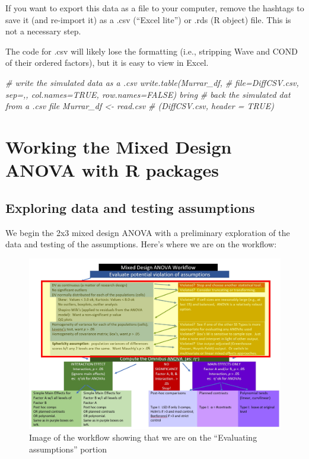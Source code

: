 \documentclass[
  11pt,
]{book}
\newenvironment{Shaded}{\begin{snugshade}}{\end{snugshade}}
\newcommand{\CommentTok}[1]{\textcolor[rgb]{0.56,0.35,0.01}{\textit{#1}}}
\begin{document}
If you want to export this data as a file to your computer, remove the hashtags to save it (and re-import it) as a .csv (``Excel lite'') or .rds (R object) file. This is not a necessary step.

The code for .csv will likely lose the formatting (i.e., stripping Wave and COND of their ordered factors), but it is easy to view in Excel.

\begin{Shaded}
\begin{Highlighting}[]
\CommentTok{\# write the simulated data as a .csv write.table(Murrar\_df,}
\CommentTok{\# file=\textquotesingle{}DiffCSV.csv\textquotesingle{}, sep=\textquotesingle{},\textquotesingle{}, col.names=TRUE, row.names=FALSE) bring}
\CommentTok{\# back the simulated dat from a .csv file Murrar\_df \textless{}{-} read.csv}
\CommentTok{\# (\textquotesingle{}DiffCSV.csv\textquotesingle{}, header = TRUE)}
\end{Highlighting}
\end{Shaded}

\hypertarget{working-the-mixed-design-anova-with-r-packages}{%
\section{Working the Mixed Design ANOVA with R packages}\label{working-the-mixed-design-anova-with-r-packages}}

\hypertarget{exploring-data-and-testing-assumptions}{%
\subsection{Exploring data and testing assumptions}\label{exploring-data-and-testing-assumptions}}

We begin the 2x3 mixed design ANOVA with a preliminary exploration of the data and testing of the assumptions. Here's where we are on the workflow:

\begin{figure}
\centering
\includegraphics{images/mixed/mx_Assumptions.jpg}
\caption{Image of the workflow showing that we are on the ``Evaluating assumptions'' portion}
\end{figure}
\end{document}
